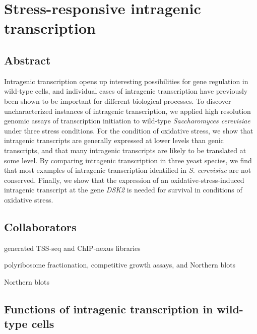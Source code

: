 \chapter{Stress-responsive intragenic transcription}
\label{chapter:stress}

\section{Abstract}

Intragenic transcription opens up interesting possibilities for gene regulation in wild-type cells, and individual cases of intragenic transcription have previously been shown to be important for different biological processes.
To discover uncharacterized instances of intragenic transcription, we applied high resolution genomic assays of transcription initiation to wild-type \textit{Saccharomyces cerevisiae} under three stress conditions.
For the condition of oxidative stress, we show that intragenic transcripts are generally expressed at lower levels than genic transcripts, and that many intragenic transcripts are likely to be translated at some level.
By comparing intragenic transcription in three yeast species, we find that most examples of intragenic transcription identified in \textit{S. cerevisiae} are not conserved.
Finally, we show that the expression of an oxidative-stress-induced intragenic transcript at the gene \textit{DSK2} is needed for survival in conditions of oxidative stress.

\clearpage

\section{Collaborators}

\begin{description}[align=right, labelwidth=5cm, noitemsep, leftmargin=!]
    \item [Steve Doris] generated TSS-seq and ChIP-nexus libraries
    \item [Dan Spatt] polyribosome fractionation, competitive growth assays, and Northern blots
    \item [James Warner] Northern blots
\end{description}

\section{Functions of intragenic transcription in wild-type cells}

